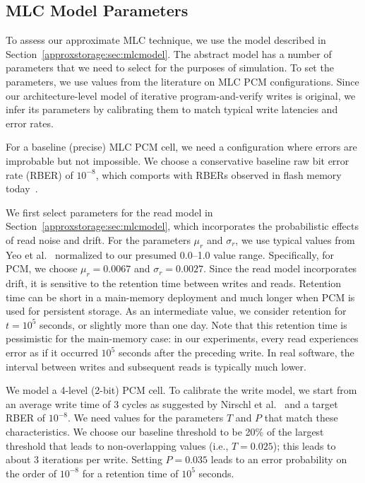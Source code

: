 \subsection{MLC Model Parameters}
\label{approxstorage:sec:errorparams}

To assess our approximate MLC technique, we use the model described in
Section~\ref{approxstorage:sec:mlcmodel}. The abstract model has a number of parameters that
we need to select for the purposes of simulation. To set the parameters, we use
values from the literature on MLC PCM configurations. Since our
architecture-level model of iterative program-and-verify writes is original, we
infer its parameters by calibrating them to match typical write latencies and error
rates.

For a baseline (precise) MLC PCM cell, we need a configuration where
errors are improbable but not impossible. We choose a conservative
baseline raw bit error rate (RBER) of $10^{-8}$, which comports with
RBERs observed in flash memory today~\cite{flasherror,flasherrors}.

We first select parameters for the read model in Section~\ref{approxstorage:sec:mlcmodel},
which incorporates the probabilistic effects of read noise and drift.
For the parameters $\mu_r$ and $\sigma_r$, we use typical values from
Yeo et al.~\cite{wdddmlcpcm} normalized to our presumed 0.0--1.0 value
range. Specifically, for PCM, we choose $\mu_r = 0.0067$ and $\sigma_r
= 0.0027$. Since the read model incorporates drift, it is sensitive to
the retention time between writes and reads. Retention time can be
short in a main-memory deployment and much longer when PCM is
used for persistent storage.  As an intermediate value, we consider
retention for $t = 10^{5}$ seconds, or slightly more than one day.
Note that this retention time is pessimistic for the main-memory
case: in our experiments, every read experiences error as if it
occurred $10^5$ seconds after the preceding write. In real software,
the interval between writes and subsequent reads is typically much
lower.

We model a 4-level (2-bit) PCM cell. To calibrate the write model, we start from an average write
time of 3 cycles as suggested by Nirschl et
al.~\cite{mlcwritestrategies} and a target RBER of $10^{-8}$.
We need values for the parameters $T$ and $P$ that
match these characteristics. We choose our baseline threshold to be 20\%
of the largest threshold that leads to non-overlapping values
(i.e., $T = 0.025$); this leads to about 3 iterations per write.
Setting $P = 0.035$ leads to an error probability on the order of
$10^{-8}$ for a retention time of $10^5$ seconds.

